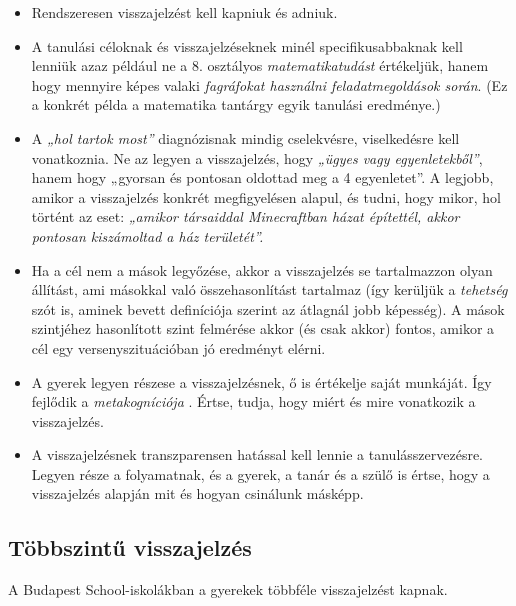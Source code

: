 \begin{itemize}
\tightlist
\item
  Rendszeresen visszajelzést kell kapniuk és adniuk.
\item
  A tanulási céloknak és visszajelzéseknek minél specifikusabbaknak kell
  lenniük azaz például ne a 8. osztályos \emph{matematikatudást}
  értékeljük, hanem hogy mennyire képes valaki \emph{fagráfokat
  használni feladatmegoldások során}. (Ez a konkrét példa a matematika
  tantárgy egyik tanulási eredménye.)
\item
  A \emph{„hol tartok most''} diagnózisnak mindig cselekvésre,
  viselkedésre kell vonatkoznia. Ne az legyen a visszajelzés, hogy
  \emph{„ügyes vagy egyenletekből''}, hanem hogy {„gyorsan és pontosan
  oldottad meg a 4 egyenletet''}. A legjobb, amikor a visszajelzés
  konkrét megfigyelésen alapul, és tudni, hogy mikor, hol történt az
  eset: \emph{„amikor társaiddal Minecraftban házat építettél, akkor
  pontosan kiszámoltad a ház területét''.}
\item
  Ha a cél nem a mások legyőzése, akkor a visszajelzés se tartalmazzon
  olyan állítást, ami másokkal való összehasonlítást tartalmaz (így kerüljük a \emph{tehetség}
  szót is, aminek bevett definíciója szerint az átlagnál jobb képesség).
  A mások szintjéhez hasonlított szint felmérése akkor (és csak akkor) fontos, amikor a
  cél egy versenyszituációban jó eredményt elérni.
\item
  A gyerek legyen részese a visszajelzésnek, ő is értékelje saját
  munkáját. Így fejlődik a
  {\emph{metakogníciója}} {\autocite{eef:18}}.
  Értse, tudja, hogy miért és mire vonatkozik a visszajelzés.
\item
  A visszajelzésnek transzparensen hatással kell lennie a
  tanulásszervezésre. Legyen része a folyamatnak, és a gyerek, a tanár és
  a szülő is értse, hogy a visszajelzés alapján mit és hogyan csinálunk
  másképp.
\end{itemize}

\hypertarget{tobbszintu-visszajelzes}{%
\subsection{Többszintű visszajelzés}\label{tobbszintu-visszajelzes}}

A Budapest School-iskolákban a gyerekek többféle visszajelzést kapnak.

